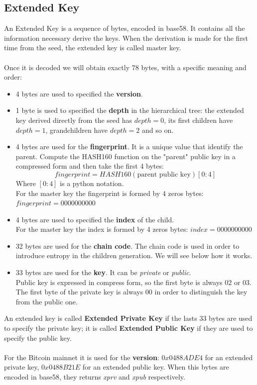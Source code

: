 \subsection{Extended Key}
An Extended Key is a sequence of bytes, encoded in base58. It contains all the information necessary derive the keys. When the derivation is made for the first time from the seed, the extended key is called master key.\\ \\
Once it is decoded we will obtain exactly 78 bytes, with a specific meaning and order:
\begin{itemize}[label=$\circledast$]
	\item 4 bytes are used to specified the \textbf{version}.
	\item 1 byte is used to specified the \textbf{depth} in the hierarchical tree: the extended key derived directly from the seed has $depth=0$, its first children have $depth=1$, grandchildren have $depth=2$ and so on.
	\item 4 bytes are used for the \textbf{fingerprint}. It is a unique value that identify the parent. Compute the HASH160 function on the "parent" public key in a compressed form and then take the first 4 bytes:
	\begin{equation*}
	fingerprint=HASH160(\text{parent public key})[0:4]
	\end{equation*}
	Where $[0:4]$ is a python notation.\\
	For the master key the fingerprint is formed by 4 zeros bytes: $fingerprint=0000000000$
	\item 4 bytes are used to specified the \textbf{index} of the child. \\
	For the master key the index is formed by 4 zeros bytes: $index=0000000000$
	\item 32 bytes are used for the \textbf{chain code}. The chain code is used in order to introduce entropy in the children generation. We will see below how it works.
	\item 33 bytes are used for the \textbf{key}. It can be \textit{private} or \textit{public}. \\ Public key is expressed in compress form, so the first byte is always $02$ or $03$. The first byte of the private key is always $00$ in order to distinguish the key from the public one.\\
\end{itemize}
An extended key is called \textbf{Extended Private Key} if the lasts 33 bytes are used to specify the private key; it is called \textbf{Extended Public Key} if they are used to specify the public key.
\\ \\
For the Bitcoin mainnet it is used for the \textbf{version}: $0x0488ADE4$ for an extended private key, $0x0488B21E$ for an extended public key. When this bytes are encoded in base58, they returns \textit{xprv} and \textit{xpub} respectively.

